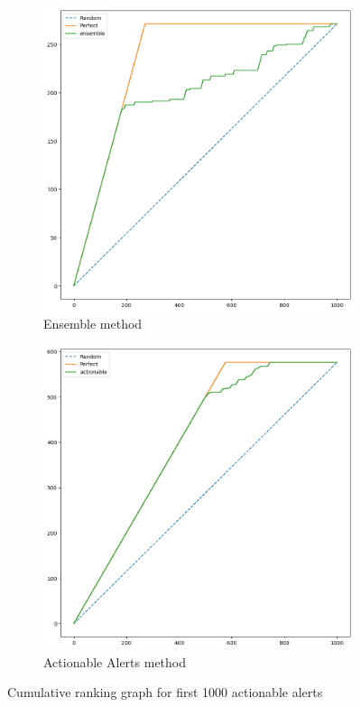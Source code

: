 \begin{figure}[H]
	\begin{subfigure}{.5\textwidth}
		\centering
		\includegraphics[scale=0.3]{./src/ensemble/ensemble_cumulative_graph_top1000.png}
		\caption{Ensemble method}\label{}
	\end{subfigure}%
	\begin{subfigure}{.5\textwidth}
		\centering
		\includegraphics[scale=0.3]{./src/ensemble/actionable_cumulative_graph_top1000.png}
		\caption{Actionable Alerts method}
	\end{subfigure}
	\caption{Cumulative ranking graph for first 1000 actionable alerts}
	\label{results:ensemble_act}
\end{figure}

